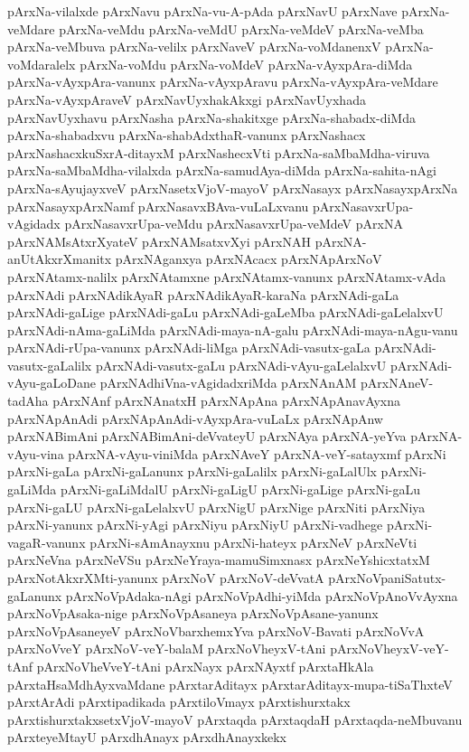 {pArxNa-vilalxde
pArxNavu
pArxNa-vu-A-pAda
pArxNavU
pArxNave
pArxNa-veMdare
pArxNa-veMdu
pArxNa-veMdU
pArxNa-veMdeV
pArxNa-veMba
pArxNa-veMbuva
pArxNa-velilx
pArxNaveV
pArxNa-voMdanenxV
pArxNa-voMdaralelx
pArxNa-voMdu
pArxNa-voMdeV
pArxNa-vAyxpAra-diMda
pArxNa-vAyxpAra-vanunx
pArxNa-vAyxpAravu
pArxNa-vAyxpAra-veMdare
pArxNa-vAyxpAraveV
pArxNavUyxhakAkxgi
pArxNavUyxhada
pArxNavUyxhavu
pArxNasha
pArxNa-shakitxge
pArxNa-shabadx-diMda
pArxNa-shabadxvu
pArxNa-shabAdxthaR-vanunx
pArxNashacx
pArxNashacxkuSxrA-ditayxM
pArxNashecxVti
pArxNa-saMbaMdha-viruva
pArxNa-saMbaMdha-vilalxda
pArxNa-samudAya-diMda
pArxNa-sahita-nAgi
pArxNa-sAyujayxveV
pArxNasetxVjoV-mayoV
pArxNasayx
pArxNasayxpArxNa
pArxNasayxpArxNamf
pArxNasavxBAva-vuLaLxvanu
pArxNasavxrUpa-vAgidadx
pArxNasavxrUpa-veMdu
pArxNasavxrUpa-veMdeV
pArxNA
pArxNAMsAtxrXyateV
pArxNAMsatxvXyi
pArxNAH
pArxNA-anUtAkxrXmanitx
pArxNAganxya
pArxNAcacx
pArxNApArxNoV
pArxNAtamx-nalilx
pArxNAtamxne
pArxNAtamx-vanunx
pArxNAtamx-vAda
pArxNAdi
pArxNAdikAyaR
pArxNAdikAyaR-karaNa
pArxNAdi-gaLa
pArxNAdi-gaLige
pArxNAdi-gaLu
pArxNAdi-gaLeMba
pArxNAdi-gaLelalxvU
pArxNAdi-nAma-gaLiMda
pArxNAdi-maya-nA-galu
pArxNAdi-maya-nAgu-vanu
pArxNAdi-rUpa-vanunx
pArxNAdi-liMga
pArxNAdi-vasutx-gaLa
pArxNAdi-vasutx-gaLalilx
pArxNAdi-vasutx-gaLu
pArxNAdi-vAyu-gaLelalxvU
pArxNAdi-vAyu-gaLoDane
pArxNAdhiVna-vAgidadxriMda
pArxNAnAM
pArxNAneV-tadAha
pArxNAnf
pArxNAnatxH
pArxNApAna
pArxNApAnavAyxna
pArxNApAnAdi
pArxNApAnAdi-vAyxpAra-vuLaLx
pArxNApAnw
pArxNABimAni
pArxNABimAni-deVvateyU
pArxNAya
pArxNA-yeYva
pArxNA-vAyu-vina
pArxNA-vAyu-viniMda
pArxNAveY
pArxNA-veY-satayxmf
pArxNi
pArxNi-gaLa
pArxNi-gaLanunx
pArxNi-gaLalilx
pArxNi-gaLalUlx
pArxNi-gaLiMda
pArxNi-gaLiMdalU
pArxNi-gaLigU
pArxNi-gaLige
pArxNi-gaLu
pArxNi-gaLU
pArxNi-gaLelalxvU
pArxNigU
pArxNige
pArxNiti
pArxNiya
pArxNi-yanunx
pArxNi-yAgi
pArxNiyu
pArxNiyU
pArxNi-vadhege
pArxNi-vagaR-vanunx
pArxNi-sAmAnayxnu
pArxNi-hateyx
pArxNeV
pArxNeVti
pArxNeVna
pArxNeVSu
pArxNeYraya-mamuSimxnasx
pArxNeYshicxtatxM
pArxNotAkxrXMti-yanunx
pArxNoV
pArxNoV-deVvatA
pArxNoVpaniSatutx-gaLanunx
pArxNoVpAdaka-nAgi
pArxNoVpAdhi-yiMda
pArxNoVpAnoVvAyxna
pArxNoVpAsaka-nige
pArxNoVpAsaneya
pArxNoVpAsane-yanunx
pArxNoVpAsaneyeV
pArxNoVbarxhemxYva
pArxNoV-Bavati
pArxNoVvA
pArxNoVveY
pArxNoV-veY-balaM
pArxNoVheyxV-tAni
pArxNoVheyxV-veY-tAnf
pArxNoVheVveY-tAni
pArxNayx
pArxNAyxtf
pArxtaHkAla
pArxtaHsaMdhAyxvaMdane
pArxtarAditayx
pArxtarAditayx-mupa-tiSaThxteV
pArxtArAdi
pArxtipadikada
pArxtiloVmayx
pArxtishurxtakx
pArxtishurxtakxsetxVjoV-mayoV
pArxtaqda
pArxtaqdaH
pArxtaqda-neMbuvanu
pArxteyeMtayU
pArxdhAnayx
pArxdhAnayxkekx
}
